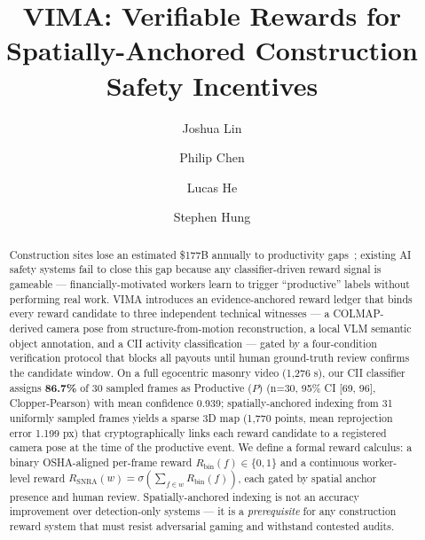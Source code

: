 \documentclass[sigconf,nonacm]{acmart}
\begin{document}
\title{VIMA: Verifiable Rewards for Spatially-Anchored Construction Safety Incentives}

\author{Joshua Lin}

\author{Philip Chen}

\author{Lucas He}

\author{Stephen Hung}

\begin{abstract}
Construction sites lose an estimated \$177B annually to productivity gaps~\cite{plangrid2018};
existing AI safety systems fail to close this gap because any classifier-driven reward
signal is gameable --- financially-motivated workers learn to trigger
``productive'' labels without performing real work.
VIMA introduces an evidence-anchored reward ledger that binds every reward
candidate to three independent technical witnesses --- a COLMAP-derived
camera pose from structure-from-motion reconstruction, a local VLM semantic
object annotation, and a CII activity classification --- gated by a four-condition
verification protocol that blocks all payouts until human ground-truth review
confirms the candidate window.
On a full egocentric masonry video (1,276 s), our CII classifier assigns
\textbf{86.7\%} of 30 sampled frames as Productive ($P$) (n=30, 95\% CI
[69, 96], Clopper-Pearson) with mean confidence 0.939; spatially-anchored indexing from
31 uniformly sampled frames yields a sparse 3D map (1,770 points, mean
reprojection error 1.199 px) that cryptographically links each reward candidate
to a registered camera pose at the time of the productive event.
We define a formal reward calculus: a binary OSHA-aligned per-frame reward
$R_{\text{bin}}(f) \in \{0,1\}$ and a continuous worker-level reward
$R_{\text{SNRA}}(w) = \sigma\!\left(\sum_{f \in w} R_{\text{bin}}(f)\right)$,
each gated by spatial anchor presence and human review.
Spatially-anchored indexing is not an accuracy improvement over
detection-only systems --- it is a \emph{prerequisite} for any construction reward
system that must resist adversarial gaming and withstand contested audits.
\end{abstract}
\end{document}
